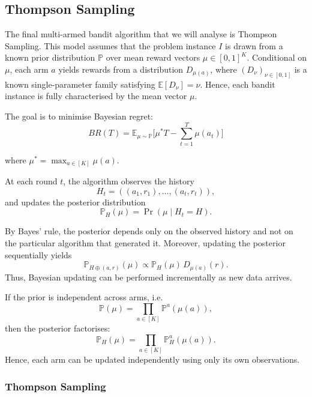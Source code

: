 \documentclass[12pt]{article}
\begin{document}
\subsection{Thompson Sampling}

The final multi-armed bandit algorithm that we will analyse is Thompson Sampling. This model assumes that the problem instance $I$ is drawn from a known prior distribution $\mathbb{P}$ over mean reward vectors $\mu \in [0,1]^K$. Conditional on $\mu$, each arm $a$ yields rewards from a distribution $D_{\mu(a)}$, where $(D_\nu)_{\nu \in [0,1]}$ is a known single-parameter family satisfying $\mathbb{E}[D_\nu]=\nu$. Hence, each bandit instance is fully characterised by the mean vector $\mu$.

The goal is to minimise Bayesian regret:
\begin{equation}
BR(T)=\mathbb{E}_{\mu \sim \mathbb{P}}\Big[\mu^*T - \sum_{t=1}^T \mu(a_t)\Big]
\tag{3.7}
\label{eq:br-regret}
\end{equation}

where $\mu^*=\max_{a \in [K]} \mu(a)$.

\vspace{5mm}


\noindent At each round $t$, the algorithm observes the history
\[
H_t = ((a_1,r_1),\dots,(a_t,r_t)),
\]
and updates the posterior distribution
\[
\mathbb{P}_H(\mu)=\Pr(\mu \mid H_t=H).
\]

By Bayes’ rule, the posterior depends only on the observed history and not on the particular algorithm that generated it. Moreover, updating the posterior sequentially yields
\[
\mathbb{P}_{H \oplus (a,r)}(\mu) \propto \mathbb{P}_H(\mu)\, D_{\mu(a)}(r).
\]
Thus, Bayesian updating can be performed incrementally as new data arrives.

\vspace{5mm}

\noindent If the prior is independent across arms, i.e.
\[
\mathbb{P}(\mu)=\prod_{a \in [K]} \mathbb{P}^a(\mu(a)),
\]
then the posterior factorises:
\[
\mathbb{P}_H(\mu)=\prod_{a \in [K]} \mathbb{P}^a_H(\mu(a)).
\]
Hence, each arm can be updated independently using only its own observations.

\vspace{5mm}

\subsubsection{Thompson Sampling}
\end{document}
